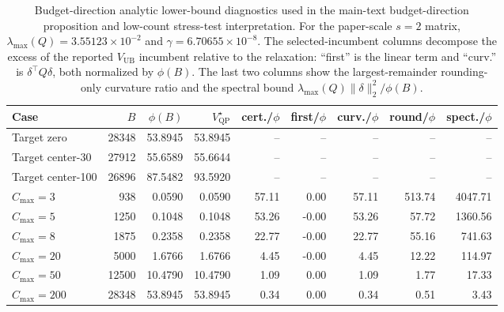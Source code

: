 \begin{table}[h]\centering\scriptsize\setlength{\tabcolsep}{2pt}
\caption{Budget-direction analytic lower-bound diagnostics used in the
main-text budget-direction proposition and low-count stress-test interpretation.
For the paper-scale
$s=2$ matrix, $\lambda_{\max}(Q)=3.55123\times10^{-2}$ and
$\gamma=6.70655\times10^{-8}$. The selected-incumbent columns decompose the
excess of the reported $V_{\mathrm{UB}}$ incumbent relative to the relaxation:
``first'' is the linear term and ``curv.'' is $\delta^\top Q\delta$, both
normalized by $\phi(B)$. The last two columns show the largest-remainder
rounding-only curvature ratio and the spectral bound
$\lambda_{\max}(Q)\|\delta\|_2^2/\phi(B)$.}
\label{tab:budget-direction-si}
\begin{tabular}{lrrrrrrrr}
\toprule
Case & $B$ & $\phi(B)$ & $V_{\mathrm{QP}}^\star$ & cert./$\phi$ &
first/$\phi$ & curv./$\phi$ & round/$\phi$ & spect./$\phi$\\
\midrule
Target zero      & 28348 & 53.8945 & 53.8945 & --    & --    & --    & --     & --\\
Target center-30 & 27912 & 55.6589 & 55.6644 & --    & --    & --    & --     & --\\
Target center-100& 26896 & 87.5482 & 93.5920 & --    & --    & --    & --     & --\\
$C_{\max}=3$     &   938 &  0.0590 &  0.0590 & 57.11 &  0.00 & 57.11 & 513.74 & 4047.71\\
$C_{\max}=5$     &  1250 &  0.1048 &  0.1048 & 53.26 & -0.00 & 53.26 &  57.72 & 1360.56\\
$C_{\max}=8$     &  1875 &  0.2358 &  0.2358 & 22.77 & -0.00 & 22.77 &  55.16 &  741.63\\
$C_{\max}=20$    &  5000 &  1.6766 &  1.6766 &  4.45 & -0.00 &  4.45 &  12.22 &  114.97\\
$C_{\max}=50$    & 12500 & 10.4790 & 10.4790 &  1.09 &  0.00 &  1.09 &   1.77 &   17.33\\
$C_{\max}=200$   & 28348 & 53.8945 & 53.8945 &  0.34 &  0.00 &  0.34 &   0.51 &    3.43\\
\bottomrule
\end{tabular}
\end{table}

